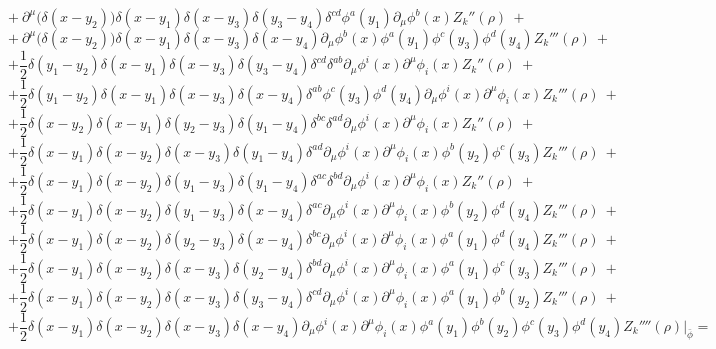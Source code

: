 $$+\ \partial^\mu\big(\delta(x - y_2)\big)\delta(x-y_1)\delta(x - y_3)\delta(y_3 - y_4)\delta^{cd}\phi^{a}(y_1)\partial_\mu\phi^{b}(x) Z_k''(\rho)\ +$$
$$+\ \partial^\mu\big(\delta(x - y_2)\big)\delta(x-y_1)\delta(x - y_3)\delta(x - y_4)\partial_\mu\phi^{b}(x)\phi^{a}(y_1)\phi^{c}(y_3)\phi^{d}(y_4) Z_k'''(\rho)\ +$$
$$+\frac{1}{2} \delta(y_1 - y_2)\delta(x-y_1)\delta(x - y_3)\delta(y_3 - y_4)\delta^{cd}\delta^{ab}\partial_\mu\phi^{i}(x)\partial^\mu\phi_i(x) Z_k''(\rho)\ +$$
$$+\frac{1}{2} \delta(y_1 - y_2)\delta(x-y_1)\delta(x - y_3)\delta(x - y_4)\delta^{ab}\phi^c(y_3)\phi^d(y_4)\partial_\mu\phi^{i}(x)\partial^\mu\phi_i(x) Z_k'''(\rho)\ +$$
$$+\frac{1}{2} \delta(x - y_2)\delta(x-y_1)\delta(y_2 - y_3)\delta(y_1 - y_4)\delta^{bc}\delta^{ad}\partial_\mu\phi^{i}(x)\partial^\mu\phi_i(x) Z_k''(\rho)\ +$$
$$+\frac{1}{2} \delta(x - y_1)\delta(x-y_2)\delta(x - y_3)\delta(y_1 - y_4)\delta^{ad} \partial_\mu\phi^{i}(x)\partial^\mu\phi_i(x)\phi^b(y_2)\phi^c(y_3) Z_k'''(\rho)\ +$$
$$+\frac{1}{2} \delta(x - y_1)\delta(x-y_2)\delta(y_1 - y_3)\delta(y_1 - y_4)\delta^{ac}\delta^{bd}\partial_\mu\phi^{i}(x)\partial^\mu\phi_i(x) Z_k''(\rho)\ +$$
$$+\frac{1}{2} \delta(x - y_1)\delta(x-y_2)\delta(y_1 - y_3)\delta(x - y_4)\delta^{ac} \partial_\mu\phi^{i}(x)\partial^\mu\phi_i(x)\phi^b(y_2)\phi^d(y_4) Z_k'''(\rho)\ +$$
$$+\frac{1}{2} \delta(x - y_1)\delta(x-y_2)\delta(y_2 - y_3)\delta(x - y_4)\delta^{bc} \partial_\mu\phi^{i}(x)\partial^\mu\phi_i(x)\phi^a(y_1)\phi^d(y_4) Z_k'''(\rho)\ +$$
$$+\frac{1}{2} \delta(x - y_1)\delta(x-y_2)\delta(x - y_3)\delta(y_2 - y_4)\delta^{bd} \partial_\mu\phi^{i}(x)\partial^\mu\phi_i(x)\phi^a(y_1)\phi^c(y_3) Z_k'''(\rho)\ +$$
$$+\frac{1}{2} \delta(x - y_1)\delta(x-y_2)\delta(x - y_3)\delta(y_3 - y_4)\delta^{cd} \partial_\mu\phi^{i}(x)\partial^\mu\phi_i(x)\phi^a(y_1)\phi^b(y_2) Z_k'''(\rho)\ +$$
$$+\frac{1}{2} \delta(x - y_1)\delta(x-y_2)\delta(x - y_3)\delta(x - y_4)\partial_\mu\phi^{i}(x)\partial^\mu\phi_i(x)\phi^a(y_1)\phi^b(y_2)\phi^c(y_3)\phi^d(y_4) Z_k''''(\rho)\Big|_{\bar{\phi}} = $$

